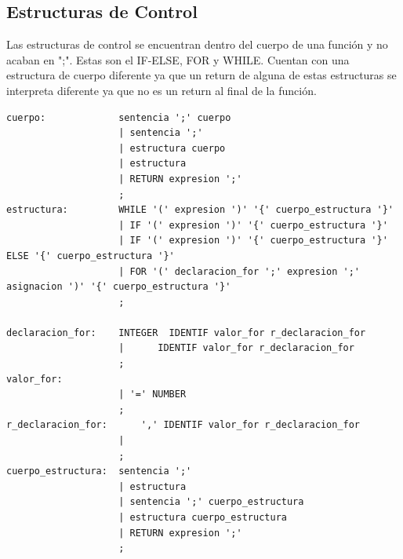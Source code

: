\documentclass[12pt,a4paper]{article}
\begin{document}
\subsection{Estructuras de Control}
\noindent Las estructuras de control se encuentran dentro del cuerpo de una función y no acaban en ";". 
Estas son el IF-ELSE, FOR y WHILE. Cuentan con una estructura de cuerpo diferente ya que un return de 
alguna de estas estructuras se interpreta diferente ya que no es un return al final de la función.
\begin{lstlisting}
cuerpo:             sentencia ';' cuerpo                        
                    | sentencia ';'                                
                    | estructura cuerpo                                                                    
                    | estructura                                  
                    | RETURN expresion ';'                        
                    ;
estructura:         WHILE '(' expresion ')' '{' cuerpo_estructura '}'                                    
                    | IF '(' expresion ')' '{' cuerpo_estructura '}'                                     
                    | IF '(' expresion ')' '{' cuerpo_estructura '}' ELSE '{' cuerpo_estructura '}'                                                                        
                    | FOR '(' declaracion_for ';' expresion ';' asignacion ')' '{' cuerpo_estructura '}'                                        
                    ;

declaracion_for:    INTEGER  IDENTIF valor_for r_declaracion_for    
                    |      IDENTIF valor_for r_declaracion_for                                           
                    ;
valor_for:                                                          
                    | '=' NUMBER                                                                                      
                    ;
r_declaracion_for:      ',' IDENTIF valor_for r_declaracion_for                                                    
                    |                                              
                    ;
cuerpo_estructura:  sentencia ';'                               
                    | estructura                                      
                    | sentencia ';' cuerpo_estructura           
                    | estructura cuerpo_estructura                        
                    | RETURN expresion ';'                                                           
                    ;
\end{lstlisting}
\end{document}

